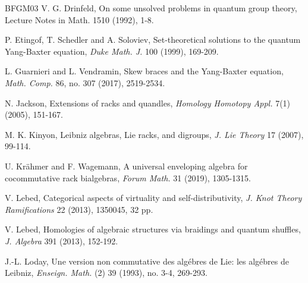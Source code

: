 \documentclass[a4paper,reqno,10pt]{amsart}
\theoremstyle{plain}
\theoremstyle{definition}
\theoremstyle{remark}
\begin{document}
\begin{thebibliography}{BFGM03}
 V. G. Drinfeld, On some unsolved problems in quantum group theory, Lecture Notes in Math. 1510 (1992),
1-8.


 P. Etingof, T. Schedler and A. Soloviev, Set-theoretical solutions to the quantum Yang-Baxter equation, {\em Duke Math. J.} 100 (1999), 169-209.



 L. Guarnieri and L. Vendramin, Skew braces and the Yang-Baxter equation, {\em Math. Comp.} 86, no. 307 (2017), 2519-2534.




 N. Jackson, Extensions of racks and quandles, {\em Homology Homotopy Appl.} 7(1) (2005), 151-167.

 M. K. Kinyon, Leibniz algebras, Lie racks, and digroups, {\em J. Lie Theory} 17 (2007), 99-114.


 U. Kr\"{a}hmer and F. Wagemann, A universal enveloping algebra for cocommutative rack bialgebras, {\em Forum Math.} 31 (2019), 1305-1315.

 V. Lebed, Categorical aspects of virtuality and self-distributivity, {\em J. Knot Theory Ramifications} 22 (2013), 1350045, 32 pp.

 V. Lebed, Homologies of algebraic structures via braidings and quantum shuffles, {\em J. Algebra} 391 (2013), 152-192.

 J.-L. Loday, Une version non commutative des alg\'{e}bres de Lie: les alg\'{e}bres de Leibniz, {\em Enseign. Math.} (2) 39 (1993), no. 3-4, 269-293.


\end{thebibliography}
\end{document}
